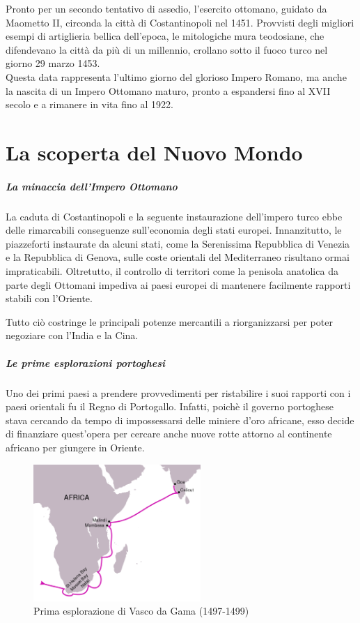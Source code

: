 \documentclass[11pt]{report}
\begin{document}
	Pronto per un secondo tentativo di assedio, l'esercito ottomano, guidato da Maometto II, circonda la città di Costantinopoli nel 1451. Provvisti degli migliori esempi di artiglieria bellica dell'epoca, le mitologiche mura teodosiane, che difendevano la città da più di un millennio, crollano sotto il fuoco turco nel giorno 29 marzo 1453.\\
	
	Questa data rappresenta l'ultimo giorno del glorioso Impero Romano, ma anche la nascita di un Impero Ottomano maturo, pronto a espandersi fino al XVII secolo e a rimanere in vita fino al 1922. 
	
	\chapter{La scoperta del Nuovo Mondo}
	
	\paragraph*{La minaccia dell'Impero Ottomano}
	
	La caduta di Costantinopoli e la seguente instaurazione dell'impero turco ebbe delle rimarcabili conseguenze sull'economia degli stati europei. Innanzitutto, le piazzeforti instaurate da alcuni stati, come la Serenissima Repubblica di Venezia e la Repubblica di Genova, sulle coste orientali del Mediterraneo risultano ormai impraticabili. Oltretutto, il controllo di territori come la penisola anatolica da parte degli Ottomani impediva ai paesi europei di mantenere facilmente rapporti stabili con l'Oriente.
	
	Tutto ciò costringe le principali potenze mercantili a riorganizzarsi per poter negoziare con l'India e la Cina. 
	
	\paragraph*{Le prime esplorazioni portoghesi}
	
	Uno dei primi paesi a prendere provvedimenti per ristabilire i suoi rapporti con i paesi orientali fu il Regno di Portogallo. Infatti, poichè il governo portoghese stava cercando da tempo di impossessarsi delle miniere d'oro africane, esso decide di finanziare quest'opera per cercare anche nuove rotte attorno al continente africano per giungere in Oriente.
	
	\begin{figure}
		\includegraphics[width=2.5in]{"vasco da gama"}
		\caption{{\small Prima esplorazione di Vasco da Gama (1497-1499)}}
	\end{figure} 
	
\end{document}
